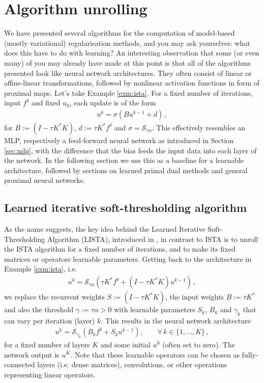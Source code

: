 \section{Algorithm unrolling}
We have presented several algorithms for the computation of model-based (mostly variational) regularisation methods, and you may ask yourselves: what does this have to do with learning? An interesting observation that some (or even many) of you may already have made at this point is that all of the algorithms presented look like neural network architectures. They often consist of linear or affine-linear transformations, followed by nonlinear activation functions in form of proximal maps. Let's take Example \ref{exm:ista}. For a fixed number of iterations, input $f^\delta$ and fixed $u_0$, each update is of the form
\begin{align*}
    u^k = \sigma( B u^{k - 1} + d ) \, ,
\end{align*}
for $B := (I - \tau K^* K)$, $d := \tau K^* f^\delta$ and $\sigma = \mathcal{S}_{\tau \alpha}$. This effectively resembles an MLP, respectively a feed-forward neural network as introduced in Section \ref{sec:mlp}, with the difference that the bias feeds the input data into each layer of the network. In the following section we use this as a baseline for a learnable architecture, followed by sections on learned primal dual methods and general proximal neural networks.

\subsection{Learned iterative soft-thresholding algorithm}\label{sec:lista}
As the name suggests, the key idea behind the Learned Iterative Soft-Thresholding Algorithm (LISTA), introduced in \cite{gregor2010learning}, in contrast to ISTA is to unroll the ISTA algorithm for a fixed number of iterations, and to make its fixed matrices or operators learnable parameters. Getting back to the architecture in Example \ref{exm:ista}, i.e.
\begin{align*}
u^k = \mathcal{S}_{\tau \alpha}( \tau K^* f^\delta + (I - \tau K^* K) u^{k - 1} ) \, ,
\end{align*}
we replace the recurrent weights $S := (I - \tau K^* K)$, the input weights $B := \tau K^*$ and also the threshold $\gamma := \tau \alpha > 0$ with learnable parameters $S_k$, $B_k$ and $\gamma_k$ that can vary per iteration (layer) $k$. This results in the neural network architecture
\begin{align*}
u^k = \mathcal{S}_{\gamma_k}\left( B_k f^\delta + S_k u^{k - 1} \right) , \qquad \forall \, k \in \{1, \ldots, K\} \, ,
\end{align*}
for a fixed number of layers $K$ and some initial $u^0$ (often set to zero). The network output is $u^K$. Note that these learnable operators can be chosen as fully-connected layers (i.e. dense matrices), convolutions, or other operations representing linear operators.

